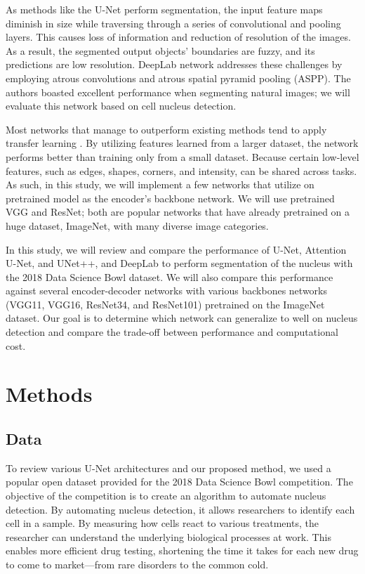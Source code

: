 \documentclass[conference]{IEEEtran}
\begin{document}
As methods like the U-Net perform segmentation, the input feature maps diminish in size while traversing through a series of convolutional and pooling layers. This causes loss of information and reduction of resolution of the images. As a result, the segmented output objects' boundaries are fuzzy, and its predictions are low resolution. DeepLab\cite{chen2017rethinking} network addresses these challenges by employing atrous convolutions and atrous spatial pyramid pooling (ASPP). The authors boasted excellent performance when segmenting natural images; we will evaluate this network based on cell nucleus detection.

Most networks that manage to outperform existing methods tend to apply transfer learning \cite{pan2009survey}. By utilizing features learned from a larger dataset, the network performs better than training only from a small dataset. Because certain low-level features, such as edges, shapes, corners, and intensity, can be shared across tasks. As such, in this study, we will implement a few networks that utilize on pretrained model as the encoder's backbone network. We will use pretrained VGG and ResNet; both are popular networks that have already pretrained on a huge dataset, ImageNet, with many diverse image categories.

In this study, we will review and compare the performance of U-Net, Attention U-Net, and UNet++, and DeepLab to perform segmentation of the nucleus with the 2018 Data Science Bowl dataset. We will also compare this performance against several encoder-decoder networks with various backbones networks (VGG11, VGG16, ResNet34, and ResNet101) pretrained on the ImageNet dataset. Our goal is to determine which network can generalize to well on nucleus detection and compare the trade-off between performance and computational cost.

\section{Methods}

\subsection{Data}

To review various U-Net architectures and our proposed method, we used a popular open dataset provided for the 2018 Data Science Bowl competition. The objective of the competition is to create an algorithm to automate nucleus detection. By automating nucleus detection, it allows researchers to identify each cell in a sample. By measuring how cells react to various treatments, the researcher can understand the underlying biological processes at work. This enables more efficient drug testing, shortening the time it takes for each new drug to come to market—from rare disorders to the common cold. 
\end{document}
